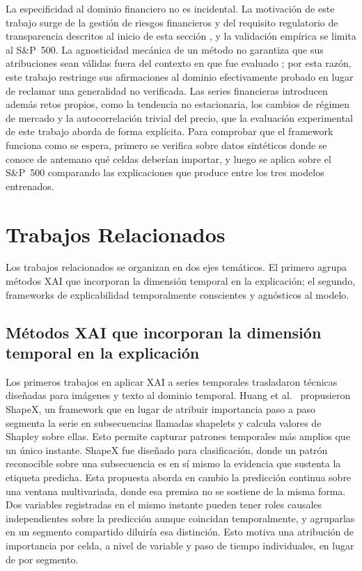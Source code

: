 \documentclass[conference, letterpaper]{IEEEtran}
\begin{document}
La especificidad al dominio financiero no es incidental. La motivación de este trabajo surge de la gestión de riesgos financieros y del requisito regulatorio de transparencia descritos al inicio de esta sección \cite{arsenault2025}, y la validación empírica se limita al S\&P~500. La agnosticidad mecánica de un método no garantiza que sus atribuciones sean válidas fuera del contexto en que fue evaluado \cite{adebayo2018}; por esta razón, este trabajo restringe sus afirmaciones al dominio efectivamente probado en lugar de reclamar una generalidad no verificada. Las series financieras introducen además retos propios, como la tendencia no estacionaria, los cambios de régimen de mercado y la autocorrelación trivial del precio, que la evaluación experimental de este trabajo aborda de forma explícita. Para comprobar que el framework funciona como se espera, primero se verifica sobre datos sintéticos donde se conoce de antemano qué celdas deberían importar, y luego se aplica sobre el S\&P~500 comparando las explicaciones que produce entre los tres modelos entrenados.
\section{Trabajos Relacionados}
\label{sec:trabajos_relacionados}

Los trabajos relacionados se organizan en dos ejes temáticos. El primero agrupa métodos XAI que incorporan la dimensión temporal en la explicación; el segundo, frameworks de explicabilidad temporalmente conscientes y agnósticos al modelo.
\subsection{Métodos XAI que incorporan la dimensión temporal en la explicación}

Los primeros trabajos en aplicar XAI a series temporales trasladaron técnicas diseñadas para imágenes y texto al dominio temporal. Huang et al.~\cite{huang2025} propusieron ShapeX, un framework que en lugar de atribuir importancia paso a paso segmenta la serie en subsecuencias llamadas shapelets y calcula valores de Shapley sobre ellas. Esto permite capturar patrones temporales más amplios que un único instante. ShapeX fue diseñado para clasificación, donde un patrón reconocible sobre una subsecuencia es en sí mismo la evidencia que sustenta la etiqueta predicha. Esta propuesta aborda en cambio la predicción continua sobre una ventana multivariada, donde esa premisa no se sostiene de la misma forma. Dos variables registradas en el mismo instante pueden tener roles causales independientes sobre la predicción aunque coincidan temporalmente, y agruparlas en un segmento compartido diluiría esa distinción. Esto motiva una atribución de importancia por celda, a nivel de variable y paso de tiempo individuales, en lugar de por segmento.
\end{document}
